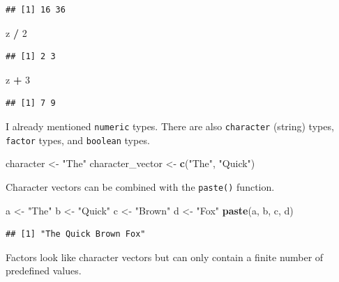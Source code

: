 \documentclass[
  openany]{book}
\newenvironment{Shaded}{\begin{snugshade}}{\end{snugshade}}
\newcommand{\DecValTok}[1]{\textcolor[rgb]{0.00,0.00,0.81}{#1}}
\newcommand{\KeywordTok}[1]{\textcolor[rgb]{0.13,0.29,0.53}{\textbf{#1}}}
\newcommand{\NormalTok}[1]{#1}
\newcommand{\OperatorTok}[1]{\textcolor[rgb]{0.81,0.36,0.00}{\textbf{#1}}}
\newcommand{\StringTok}[1]{\textcolor[rgb]{0.31,0.60,0.02}{#1}}
\begin{document}
\begin{verbatim}
## [1] 16 36
\end{verbatim}

\begin{Shaded}
\begin{Highlighting}[]
\NormalTok{z }\OperatorTok{/}\StringTok{ }\DecValTok{2}
\end{Highlighting}
\end{Shaded}

\begin{verbatim}
## [1] 2 3
\end{verbatim}

\begin{Shaded}
\begin{Highlighting}[]
\NormalTok{z }\OperatorTok{+}\StringTok{ }\DecValTok{3}
\end{Highlighting}
\end{Shaded}

\begin{verbatim}
## [1] 7 9
\end{verbatim}

I already mentioned \texttt{numeric} types. There are also \texttt{character} (string) types,
\texttt{factor} types, and \texttt{boolean} types.

\begin{Shaded}
\begin{Highlighting}[]
\NormalTok{character <-}\StringTok{ "The"}
\NormalTok{character_vector <-}\StringTok{ }\KeywordTok{c}\NormalTok{(}\StringTok{"The"}\NormalTok{, }\StringTok{"Quick"}\NormalTok{)}
\end{Highlighting}
\end{Shaded}

Character vectors can be combined with the \texttt{paste()} function.

\begin{Shaded}
\begin{Highlighting}[]
\NormalTok{a <-}\StringTok{ "The"}
\NormalTok{b <-}\StringTok{ "Quick"}
\NormalTok{c <-}\StringTok{ "Brown"}
\NormalTok{d <-}\StringTok{ "Fox"}
\KeywordTok{paste}\NormalTok{(a, b, c, d)}
\end{Highlighting}
\end{Shaded}

\begin{verbatim}
## [1] "The Quick Brown Fox"
\end{verbatim}

Factors look like character vectors but can only contain a finite number of predefined
values.
\end{document}
